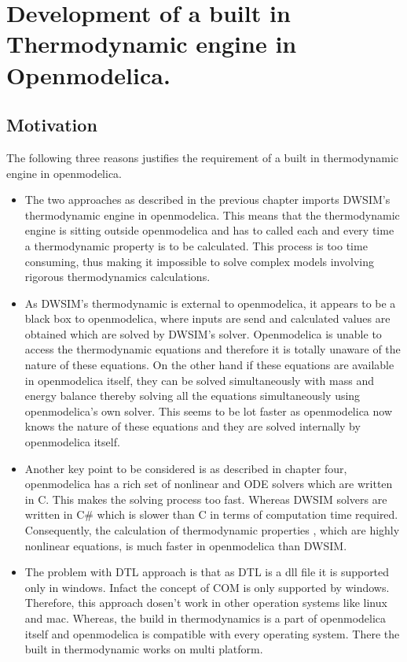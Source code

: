 \documentclass[12pt]{report}
\begin{document}
\chapter{Development of a built in Thermodynamic engine in Openmodelica.}

\section{Motivation}

The following three reasons justifies the requirement of a built in thermodynamic engine in openmodelica.

\begin{itemize}

\item The two approaches as described in the previous chapter imports DWSIM's thermodynamic engine in openmodelica. This means that the thermodynamic engine is sitting outside openmodelica and has to called each and every time a thermodynamic property is to be calculated. This process is too time consuming, thus making it impossible to solve complex models involving rigorous thermodynamics calculations. 

\item As DWSIM's thermodynamic is external to openmodelica, it appears to be a black box to openmodelica, where inputs are send and calculated values are obtained which are solved by DWSIM's solver. Openmodelica is unable to access the thermodynamic equations and therefore it is totally unaware of the nature of these equations. On the other hand if these equations are available in openmodelica itself, they can be solved simultaneously with mass and energy balance thereby solving all the equations simultaneously using openmodelica's own solver. This seems to be lot faster as openmodelica now knows the nature of these equations and they are solved internally by openmodelica itself.

\item Another key point to be considered is as described in chapter four, openmodelica has a rich set of nonlinear and ODE solvers which are written in C. This makes the solving process too fast. Whereas DWSIM solvers are written in C\# which is slower than C in terms of computation time required. Consequently, the calculation of thermodynamic properties , which are highly nonlinear equations, is much faster in openmodelica than DWSIM. 

\item The problem with DTL approach is that as DTL is a dll file it is supported only in windows. Infact the concept of COM is only supported by windows. Therefore, this approach dosen't work in other operation systems like linux and mac. Whereas, the build in thermodynamics is a part of openmodelica itself and openmodelica is compatible with every operating system. There the built in thermodynamic works on multi platform.

\end{itemize}
\end{document}

